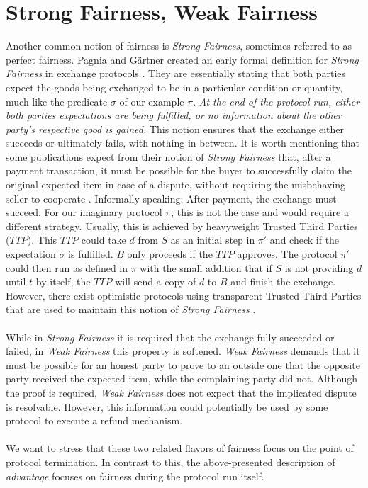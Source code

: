 \documentclass{cacthesis}
\newcounter{protocol}
\begin{document}
        \section{Strong Fairness, Weak Fairness}
        \label{sec:StrongFairnessWeakFairness}
        Another common notion of fairness is \textit{Strong Fairness}, sometimes referred to as perfect fairness. Pagnia and Gärtner created an early formal definition for \textit{Strong Fairness} in exchange protocols \cite{Pagnia99onthe}. They are essentially stating that both parties expect the goods being exchanged to be in a particular condition or quantity, much like the predicate $\sigma$ of our example $\pi$. \textit{At the end of the protocol run, either both parties expectations are being fulfilled, or no information about the other party's respective good is gained.} This notion ensures that the exchange either succeeds or ultimately fails, with nothing in-between.
        It is worth mentioning that some publications expect from their notion of \textit{Strong Fairness} that, after a payment transaction, it must be possible for the buyer to successfully claim the original expected item in case of a dispute, without requiring the misbehaving seller to cooperate \cite{10.1007/3-540-36552-4_31}. Informally speaking: After payment, the exchange must succeed. For our imaginary protocol $\pi$, this is not the case and would require a different strategy. Usually, this is achieved by heavyweight Trusted Third Parties ($TTP$). This $TTP$ could take $d$ from $S$ as an initial step in $\pi'$ and check if the expectation $\sigma$ is fulfilled. $B$ only proceeds if the $TTP$ approves. The protocol $\pi'$ could then run as defined in $\pi$ with the small addition that if $S$ is not providing $d$ until $t$ by itself, the $TTP$ will send a copy of $d$ to $B$ and finish the exchange. However, there exist optimistic protocols using transparent Trusted Third Parties that are used to maintain this notion of \textit{Strong Fairness} \cite{10.1007/3-540-36552-4_31} \cite{6982058}. \\\\
        While in \textit{Strong Fairness} it is required that the exchange fully succeeded or failed, in \textit{Weak Fairness} this property is softened. 
        \textit{Weak Fairness} demands that it must be possible for an honest party to prove to an outside one that the opposite party received the expected item, while the complaining party did not. Although the proof is required, \textit{Weak Fairness} does not expect that the implicated dispute is resolvable. However, this information could potentially be used by some protocol to execute a refund mechanism. \\\\
        We want to stress that these two related flavors of fairness focus on the point of protocol termination. In contrast to this, the above-presented description of \textit{advantage} focuses on fairness during the protocol run itself.
        
\end{document}
